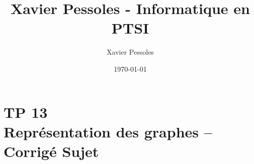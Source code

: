 \documentclass[
	fontsize=10pt, %
	twoside=true, %
]{kaobook}
\newcommand{\repRel}{../../../..}
\newcommand{\repStyle}{\repRel/Style}
\begin{document}

\titlehead{Xavier Pessoles - Informatique en PTSI}
\title[Xavier Pessoles - Informatique en PTSI]{Xavier Pessoles - Informatique en PTSI}
\author[XP]{Xavier Pessoles}
\date{\today}


\begingroup %
\endgroup

%
\mainmatter %
%
%
%
%


\setcounter{margintocdepth}{\sectiontocdepth}
\marginlayout
\graphicspath{{\repStyle/png}}

\pagestyle{xp.scrheadings}


%



\newcommand{\repExo}{}
\newcommand{\nomExo}{}

\livrettrue %
\livrettrue
\colletrue








\chapter*{TP 13 \\ 
Représentation des graphes -- \ifprof Corrigé \else Sujet \fi}
\end{document}
